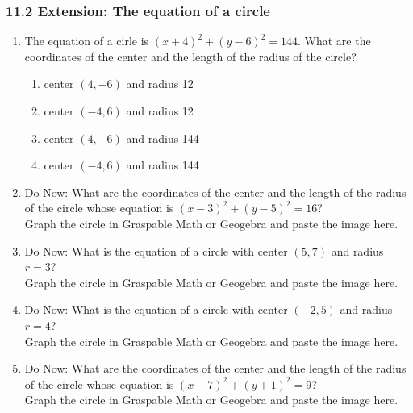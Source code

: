 

\fancyhead[LE]{\thepage}



\subsubsection*{11.2 Extension: The equation of a circle}
\begin{enumerate}
\item The equation of a cirle is $(x+4)^2+(y-6)^2=144$. What are the coordinates of the center and the length of the radius of the circle?
  \begin{enumerate}
    \item center $(4,-6)$ and radius 12
    \item center $(-4,6)$ and radius 12
    \item center $(4,-6)$ and radius 144
    \item center $(-4,6)$ and radius 144
  \end{enumerate}

\item Do Now: What are the coordinates of the center and the length of the radius of the circle whose equation is $(x-3)^2+(y-5)^2=16$?\\[0.5cm]
Graph the circle in Graspable Math or Geogebra and paste the image here.

\item Do Now: What is the equation of a circle with center $(5,7)$ and radius $r=3$?\\[0.5cm]
Graph the circle in Graspable Math or Geogebra and paste the image here.

\item Do Now: What is the equation of a circle with center $(-2,5)$ and radius $r=4$?\\[0.5cm]
Graph the circle in Graspable Math or Geogebra and paste the image here.


\item Do Now: What are the coordinates of the center and the length of the radius of the circle whose equation is $(x-7)^2+(y+1)^2=9$?\\[0.5cm]
Graph the circle in Graspable Math or Geogebra and paste the image here.


\end{enumerate}
